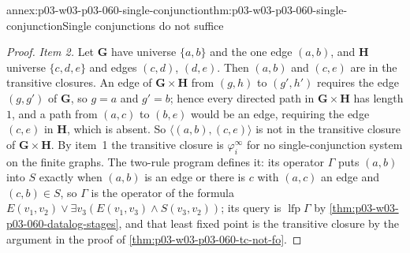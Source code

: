\begin{annexitem}{annex:p03-w03-p03-060-single-conjunction}{thm:p03-w03-p03-060-single-conjunction}{Single conjunctions do not suffice}
\begin{proof}
\emph{Item 2.} Let \(\mathbf G\) have universe \(\{a,b\}\) and the one edge
\((a,b)\), and \(\mathbf H\) universe \(\{c,d,e\}\) and edges \((c,d)\),
\((d,e)\). Then \((a,b)\) and \((c,e)\) are in the transitive closures.
An edge of \(\mathbf G\times\mathbf H\) from \((g,h)\) to \((g',h')\)
requires the edge \((g,g')\) of \(\mathbf G\), so \(g=a\) and \(g'=b\);
hence every directed path in \(\mathbf G\times\mathbf H\) has length
\(1\), and a path from \((a,c)\) to \((b,e)\) would be an edge, requiring
the edge \((c,e)\) in \(\mathbf H\), which is absent. So
\(\langle(a,b),(c,e)\rangle\) is not in the transitive closure of
\(\mathbf G\times\mathbf H\). By item~1 the transitive closure is
\(\varphi^\infty_i\) for no single-conjunction system on the finite graphs.
The two-rule program defines it: its operator \(\Gamma\) puts \((a,b)\)
into \(S\) exactly when \((a,b)\) is an edge or there is \(c\) with
\((a,c)\) an edge and \((c,b)\in S\), so \(\Gamma\) is the operator of the
formula \(E(v_1,v_2)\vee\exists v_3(E(v_1,v_3)\wedge S(v_3,v_2))\); its
query is \(\operatorname{lfp}\Gamma\) by
\cref{thm:p03-w03-p03-060-datalog-stages}, and that least fixed point is
the transitive closure by the argument in the proof of
\cref{thm:p03-w03-p03-060-tc-not-fo}.
\end{proof}
\end{annexitem}

